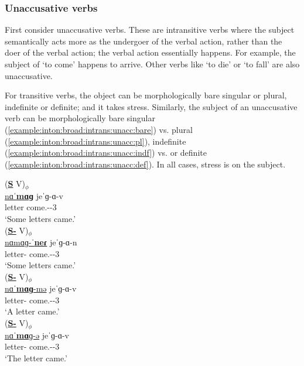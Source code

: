 \subsubsection{Unaccusative verbs}\label{section:intonation:broadFocus:intrans:unacc}
First consider unaccusative verbs. These are intransitive verbs where the subject semantically acts more as the undergoer of the verbal action, rather than the doer of the verbal action; the verbal action essentially happens. For example, the subject of `to come' happens to arrive. Other verbs like `to die' or `to fall' are also unaccusative. 

For transitive verbs, the object can be morphologically bare singular or plural, indefinite or definite; and it takes stress. Similarly,  the subject of an unaccusative verb can be morphologically bare  singular (\ref{example:inton:broad:intrans:unacc:bare}) vs.  plural (\ref{example:inton:broad:intrans:unacc:pl}),  indefinite (\ref{example:inton:broad:intrans:unacc:indf}) vs. or definite (\ref{example:inton:broad:intrans:unacc:def}). In all cases, stress is on the subject. 


\begin{exe}
	\ex \begin{xlist}
		\ex \glll (\textbf{\underline{S}} V)$_\phi$ \\
		\underline{nɑˈ\textbf{mɑɡ}} jeˈɡ-ɑ-v \\
		letter come.{\aorperf}-{\pst}-3{\sg} \\
		\trans `Some letters came.' \label{example:inton:broad:intrans:unacc:bare}
		\\
		\ex \glll (\textbf{\underline{S-{\pl}}} V)$_\phi$ \\
		\underline{nɑmɑɡ-ˈ\textbf{neɾ}} jeˈɡ-ɑ-n \\
		letter-{\pl} come.{\aorperf}-{\pst}-3{\pl} \\
		\trans `Some letters came.'\label{example:inton:broad:intrans:unacc:pl}
		\\
		\ex \glll (\textbf{\underline{S-{\indf}}} V)$_\phi$ \\
		\underline{nɑˈ\textbf{mɑɡ}-mə} jeˈɡ-ɑ-v \\
		letter-{\indf} come.{\aorperf}-{\pst}-3{\sg} \\
		\trans `A letter  came.'\label{example:inton:broad:intrans:unacc:indf}
		\\
		\ex \glll (\textbf{\underline{S-{}}} V)$_\phi$ \\
		\underline{nɑˈ\textbf{mɑ}ɡ-ə} jeˈɡ-ɑ-v \\
		letter-{} come.{\aorperf}-{\pst}-3{\sg} \\
		\trans `The letter  came.'\label{example:inton:broad:intrans:unacc:def}
		\\
	\end{xlist}
\end{exe}

